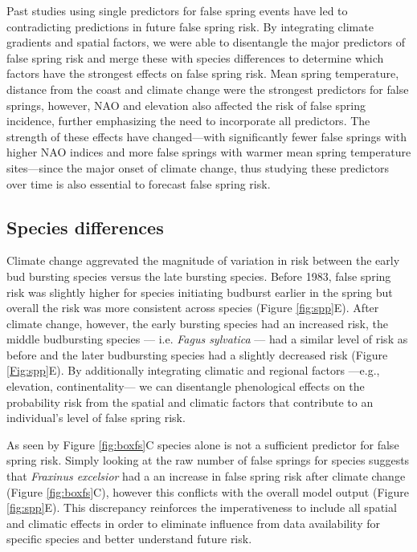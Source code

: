 \documentclass{article}\usepackage[]{graphicx}\usepackage[]{color}
\begin{document}
Past studies using single predictors for false spring events \citep{Liu2018, Ma2018, Vitasse2018, Vitra2017, Wypych2016a} have led to contradicting predictions in future false spring risk. By integrating climate gradients and spatial factors, we were able to disentangle the major predictors of false spring risk and merge these with species differences to determine which factors have the strongest effects on false spring risk. Mean spring temperature, distance from the coast and climate change were the strongest predictors for false springs, however, NAO and elevation also affected the risk of false spring incidence, further emphasizing the need to incorporate all predictors. The strength of these effects have changed---with significantly fewer false springs with higher NAO indices and more false springs with warmer mean spring temperature sites---since the major onset of climate change, thus studying these predictors over time is also essential to forecast false spring risk.

\subsection*{Species differences}
Climate change aggrevated the magnitude of variation in risk between the early bud bursting species versus the late bursting species. Before 1983, false spring risk was slightly higher for species initiating budburst earlier in the spring but overall the risk was more consistent across species (Figure \ref{fig:spp}E). After climate change, however, the early bursting species had an increased risk, the middle budbursting species --- i.e. \textit{Fagus sylvatica} --- had a similar level of risk as before and the later budbursting species had a slightly decreased risk (Figure \ref{Fig:spp}E). By additionally integrating climatic and regional factors ---e.g., elevation, continentality--- we can disentangle phenological effects on the probability risk from the spatial and climatic factors that contribute to an individual's level of false spring risk.

As seen by Figure \ref{fig:boxfs}C species alone is not a sufficient predictor for false spring risk. Simply looking at the raw number of false springs for species suggests that \textit{Fraxinus excelsior} had a an increase in false spring risk after climate change (Figure \ref{fig:boxfs}C), however this conflicts with the overall model output (Figure \ref{fig:spp}E). This discrepancy reinforces the imperativeness to include all spatial and climatic effects in order to eliminate influence from data availability for specific species and better understand future risk. 
\end{document}
